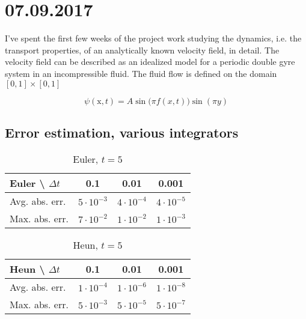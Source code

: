 \message{ !name(../journal.tex)}\documentclass[a4paper,12pt]{article}
\newcommand{\vect}[1]{{\bm{\mathrm{#1}}}}
\begin{document}
\section{07.09.2017}
I've spent the first few weeks of the project work studying the
dynamics, i.e. the transport properties,  of an analytically known
velocity field, in detail. The velocity field can be described as an
idealized model for a periodic double gyre system in an
incompressible fluid. The fluid flow is defined on the domain
$[0,1]\times[0,1]$

\begin{equation}
  \label{eq:analytical_field_stream_function}
  \psi(\vect{x},t) = A\sin\big(\pi{}f(x,t)\big)\sin(\pi{}y)
\end{equation}


\subsection{Error estimation, various integrators}

\begin{table}[h]
  \caption{Euler, $t = 5$}
  \label{tab:euler-lyapunov-error-rk4-ref}
  \centering
  \begin{tabular}[h]{l|c|c|c}
    \hline
    Euler \textbackslash\hspace{0.5em} $\Delta{t}$& 0.1 & 0.01 & 0.001 \\
    \hline
    Avg. abs. err. & $5 \cdot 10^{-3}$ & $4 \cdot 10^{-4} $ & $4 \cdot 10^{-5}$ \\
    Max. abs. err. & $7 \cdot 10^{-2}$ & $1 \cdot 10^{-2}$ & $1 \cdot 10^{-3} $ \\
    \hline
  \end{tabular}
\end{table}

\begin{table}[h]
  \caption{Heun, $t = 5$}
  \label{tab:heun-lyapunov-error-rk4-ref}
  \centering
  \begin{tabular}[h]{l|c|c|c}
    \hline
    Heun \textbackslash\hspace{0.5em} $\Delta{t}$& 0.1 & 0.01 & 0.001 \\
    \hline
    Avg. abs. err. & $1 \cdot 10^{-4}$ & $1 \cdot 10^{-6} $ & $1 \cdot 10^{-8}$ \\
    Max. abs. err. & $5 \cdot 10^{-3}$ & $5 \cdot 10^{-5}$ & $5 \cdot 10^{-7} $ \\
    \hline
  \end{tabular}
\end{table}
\end{document}

